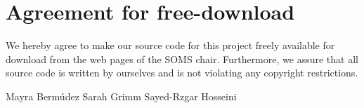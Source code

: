 
\section*{Agreement for free-download}
\bigskip


\bigskip


\large We hereby agree to make our source code for this project freely available for download from the web pages of the SOMS chair. Furthermore, we assure that all source code is written by ourselves and is not violating any copyright restrictions.


\begin{center}
\vspace{3cm}
Mayra Berm\'udez \hspace{3cm} Sarah Grimm \hspace{2cm} Sayed-Rzgar Hosseini

\end{center}

\newpage


